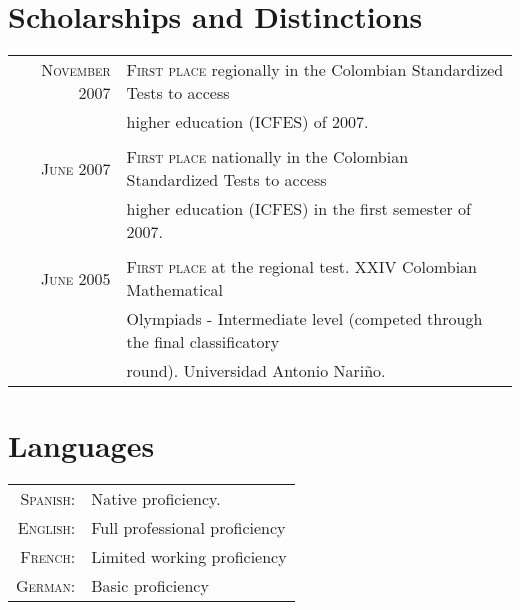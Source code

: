 \documentclass[a4paper,10pt]{article} %
\begin{document}


\color{OrangeRed}
\section{Scholarships and Distinctions}
\color{black}

\begin{tabular}{rl}

\textsc{November 2007} & \textsc{First place} regionally in the Colombian Standardized Tests to access \\ 
& higher education (ICFES) of 2007. \\ 
&\\

\textsc{June 2007} & \textsc{First place} nationally in the Colombian Standardized Tests to access  \\ 
& higher education (ICFES) in the first semester of 2007. \\ 
&\\

\textsc{June 2005} & \textsc{First place} at the regional test. XXIV Colombian Mathematical\\ 
& Olympiads - Intermediate level (competed through the final classificatory \\ & round). Universidad Antonio Nariño.

\end{tabular}


\color{OrangeRed}
\section{Languages}
\color{black}

\begin{tabular}{rl}
\textsc{Spanish:} & Native proficiency.\\

\textsc{English:} & Full professional proficiency \\

\textsc{French:} & Limited working proficiency \\

\textsc{German:} & Basic proficiency 
\end{tabular}
\end{document}
